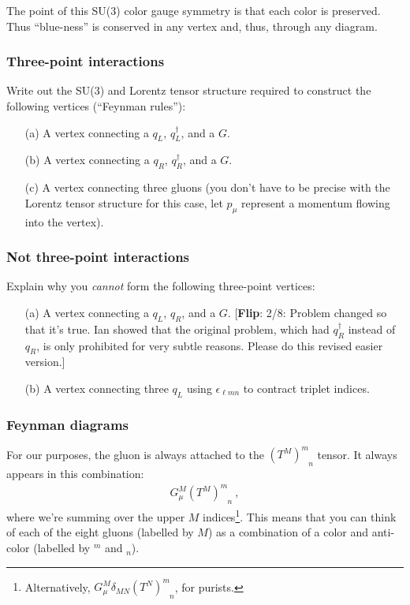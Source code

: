 \documentclass[12pt]{article}
\newcommand{\flip}[1]{{\color{red} [\textbf{Flip}: {#1}]}}
\begin{document}
The point of this SU(3) color gauge symmetry is that each color is preserved. Thus ``blue-ness'' is conserved in any vertex and, thus, through any diagram.

\subsubsection{Three-point interactions}

Write out the SU(3) and Lorentz tensor structure required to construct the following vertices (``Feynman rules''):
\begin{enumerate}
	\item[(a)] A vertex connecting a $q_L$, $q_L^\dag$, and a $G$. 
	\item[(b)] A vertex connecting a $q_R$, $q_R^\dag$, and a $G$. 
	\item[(c)] A vertex connecting three gluons (you don't have to be precise with the Lorentz tensor structure for this case, let $p_\mu$ represent a momentum flowing into the vertex). 
\end{enumerate}

\subsubsection{Not three-point interactions}

Explain why you \emph{cannot} form the following three-point vertices:
\begin{enumerate}
	\item[(a)] A vertex connecting a $q_L$, $q_R$, and a $G$. \flip{2/8: Problem changed so that it's true. Ian showed that the original problem, which had $q_R^\dag$ instead of $q_R$, is only prohibited for very subtle reasons. Please do this revised easier version.}
	\item[(b)] A vertex connecting three $q_L$ using $\epsilon_{\ell m n}$ to contract triplet indices.
\end{enumerate}

\subsubsection{Feynman diagrams}
\label{sec:gluon}

For our purposes, the gluon is always attached to the $(T^M)^m_{\phantom{m}n}$ tensor. It always appears in this combination:
\begin{align}
	G_\mu^M (T^M)^m_{\phantom{m}n} \ ,
\end{align}
where we're summing over the upper $M$ indices\footnote{Alternatively, $G_\mu^M \delta_{MN}(T^N)^m_{\phantom{m}n}$, for purists.}. This means that you can think of each of the eight gluons (labelled by $M$) as a combination of a color and anti-color (labelled by $^m$ and $_n$).
\end{document}
